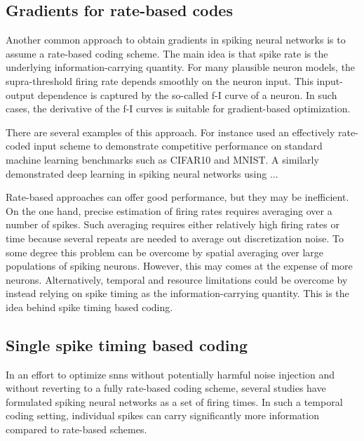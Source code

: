 \documentclass[journal,onecolumn,11pt]{IEEEtran}
\begin{document}
\subsection{Gradients for rate-based codes}

Another common approach to obtain gradients in spiking neural networks is to
assume a rate-based coding scheme.
The main idea is that spike rate is the underlying information-carrying quantity.
For many plausible neuron models, the supra-threshold firing rate depends
smoothly on the neuron input. This input-output dependence is captured by the
so-called f-I curve of a neuron.
In such cases, the derivative of the f-I curves is suitable for gradient-based optimization. 


There are several examples of this approach. 
For instance \citet{Hunsberger_Eliasmith15_spikdeep} used an effectively
rate-coded input scheme to demonstrate competitive performance on standard
machine learning benchmarks such as CIFAR10 and MNIST.
A similarly \cite{Lee_etal16_traideep} demonstrated deep learning in spiking
neural networks using ... %

Rate-based approaches can offer good performance, but they may be inefficient.
On the one hand, precise estimation of firing rates requires averaging over
a number of spikes.  Such averaging requires either relatively high firing rates or
time because several repeats are needed to average out discretization noise.  
To some degree this problem can be overcome by spatial averaging over
large populations of spiking neurons. However, this may comes at the expense of
more neurons. 
Alternatively, temporal and resource limitations could be overcome by instead relying on
spike timing as the information-carrying quantity. This is the idea behind
spike timing based coding.


\subsection{Single spike timing based coding}

In an effort to optimize \glspl{snn} without potentially harmful noise
injection and without reverting to a fully rate-based coding scheme, 
several studies have formulated spiking neural
networks as a set of firing times.
In such a temporal coding setting, individual spikes can carry significantly more
information compared to rate-based schemes.
\end{document}
